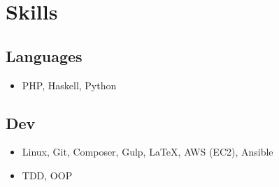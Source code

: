 \section{Skills}

\subsection{Languages}\vspace{-5pt}
\begin{itemize}
	\item PHP, Haskell, Python
\end{itemize}

\vspace{-12pt}

\subsection{Dev}\vspace{-5pt}
\begin{itemize}
	\item Linux, Git, Composer, Gulp, LaTeX, AWS (EC2), Ansible
	\item TDD, OOP
\end{itemize}